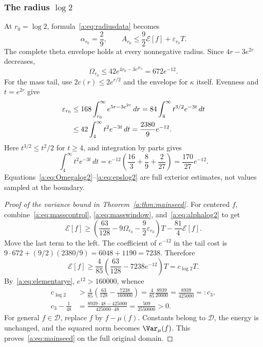\documentclass[11pt,a4paper]{article}
\numberwithin{equation}{section}
\theoremstyle{definition}\newtheorem{definition}[theorem]{Definition}
\theoremstyle{remark}\newtheorem{remark}[theorem]{Remark}
\newcommand{\E}{\mathcal E}\newcommand{\D}{\mathcal D}
\begin{document}
\subsubsection{The radius \texorpdfstring{$\log2$}{log 2}}

At $r_0=\log2$, formula~\eqref{a:eq:radiusdata} becomes
\begin{equation}\label{a:eq:alphalog2}
 \alpha_{r_0}=\frac29,\qquad
 A_{r_0}\le\frac92\E[f]+\varepsilon_{r_0}T.
\end{equation}
The complete theta envelope holds at every nonnegative radius. Since $4r-3e^{2r}$ decreases,
\begin{equation}\label{a:eq:Omegalog2}
 \Omega_{r_0}\le42e^{4r_0-3e^{2r_0}}=672e^{-12}.
\end{equation}
For the mass tail, use $2c(r)\le2e^{r/2}$ and the envelope for $\kappa$ itself. Evenness and $t=e^{2r}$ give
\begin{align}
 \varepsilon_{r_0}
 &\le168\int_{r_0}^\infty e^{5r-3e^{2r}}\,dr
 =84\int_4^\infty t^{3/2}e^{-3t}\,dt\notag\\
 &\le42\int_4^\infty t^2e^{-3t}\,dt
 =\frac{2380}{9}e^{-12}.\label{a:eq:epslog2}
\end{align}
Here $t^{3/2}\le t^2/2$ for $t\ge4$, and integration by parts gives
\[
 \int_4^\infty t^2e^{-3t}\,dt
 =e^{-12}\left(\frac{16}{3}+\frac89+\frac2{27}\right)
 =\frac{170}{27}e^{-12}.
\]
Equations~\eqref{a:eq:Omegalog2}--\eqref{a:eq:epslog2} are full exterior estimates, not values sampled at the boundary.

\begin{proof}[Proof of the variance bound in Theorem~\ref{a:thm:mainseed}]
For centered $f$, combine~\eqref{a:eq:masscontrol}, \eqref{a:eq:masswindow}, and~\eqref{a:eq:alphalog2} to get
\[
 \E[f]\ge\left(\frac{63}{128}-9\Omega_{r_0}
                       -\frac92\varepsilon_{r_0}\right)T
                         -\frac{81}{4}\E[f].
\]
Move the last term to the left. The coefficient of $e^{-12}$ in the tail cost is
$9\cdot672+(9/2)(2380/9)=6048+1190=7238$. Therefore
\[
 \E[f]\ge\frac4{85}\left(\frac{63}{128}-7238e^{-12}\right)T
 =c_{\log2}T.
\]
By~\eqref{a:eq:elementarye}, $e^{12}>160000$, whence
\begin{align*}
 c_{\log2}&>\frac4{85}\left(\frac{63}{128}-\frac{7238}{160000}\right)
 =\frac4{85}\frac{8939}{20000}=\frac{8939}{425000}=:c_3,\\
 c_3-\frac1{48}
 &=\frac{8939\cdot48-425000}{425000\cdot48}
 =\frac{509}{2550000}>0.
\end{align*}
For general $f\in\D$, replace $f$ by $f-\mu(f)$. Constants belong to $\D$, the energy is unchanged, and the squared norm becomes $\Var_\mu(f)$. This proves~\eqref{a:eq:mainseed} on the full original domain.
\end{proof}
\end{document}
